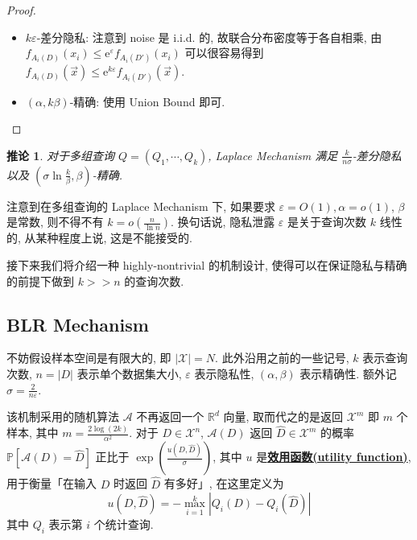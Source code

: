 \documentclass[8pt]{article}
\theoremstyle{compact}
\newtheorem{corollary}[theorem]{推论}
\def\obj#1{\textbf{\uline{#1}}}
\def\le{\leqslant}
\def\P#1{\mathbb{P}\left[{#1}\right]}
\def\e{\mathrm{e}}
\begin{document}
\begin{proof}
	\begin{itemize}
		\item $k\varepsilon$-差分隐私: 注意到 noise 是 i.i.d. 的, 故联合分布密度等于各自相乘, 由 $f_{A_i(D)}(x_i) \le \e^{\varepsilon}f_{A_i(D')}(x_i)$ 可以很容易得到 $f_{A_i(D)}(\vec x) \le \e^{k\varepsilon} f_{A_i(D')}(\vec x)$.
	    \item $(\alpha, k\beta)$-精确: 使用 Union Bound 即可.
	\end{itemize}
\end{proof}
\begin{corollary}
	对于多组查询 $Q = (Q_1, \cdots, Q_k)$, Laplace Mechanism 满足 $\frac{k}{n\sigma}$-差分隐私以及 $(\sigma\ln\frac{k}{\beta}, \beta)$-精确.
\end{corollary}

注意到在多组查询的 Laplace Mechanism 下, 如果要求 $\varepsilon = O(1), \alpha = o(1)$, $\beta$ 是常数, 则不得不有 $k = o\left(\frac{n}{\ln n}\right)$. 换句话说, 隐私泄露 $\varepsilon$ 是关于查询次数 $k$ 线性的, 从某种程度上说, 这是不能接受的.

接下来我们将介绍一种 highly-nontrivial 的机制设计, 使得可以在保证隐私与精确的前提下做到 $k >> n$ 的查询次数.

\subsection{BLR Mechanism}

不妨假设样本空间是有限大的, 即 $|\mathcal X| = N$. 此外沿用之前的一些记号, $k$ 表示查询次数, $n = |D|$ 表示单个数据集大小, $\varepsilon$ 表示隐私性, $(\alpha, \beta)$ 表示精确性. 额外记 $\sigma = \frac{2}{n\varepsilon}$.

该机制采用的随机算法 $\mathcal A$ 不再返回一个 $\mathbb R^d$ 向量, 取而代之的是返回 $\mathcal X^m$ 即 $m$ 个样本, 其中 $m = \frac{2\log(2k)}{\alpha^2}$. 对于 $D \in \mathcal X^n$, $\mathcal A(D)$ 返回 $\hat{D} \in \mathcal X^m$ 的概率 $\P{\mathcal A(D) = \hat{D}}$ 正比于 $\exp\left(\frac{u(D, \hat{D})}{\sigma}\right)$, 其中 $u$ 是\obj{效用函数(utility function)}, 用于衡量「在输入 $D$ 时返回 $\hat{D}$ 有多好」, 在这里定义为 $$u(D, \hat{D}) = -\max_{i=1}^{k}|Q_i(D) - Q_i(\hat{D})|$$ 其中 $Q_i$ 表示第 $i$ 个统计查询.
\end{document}
